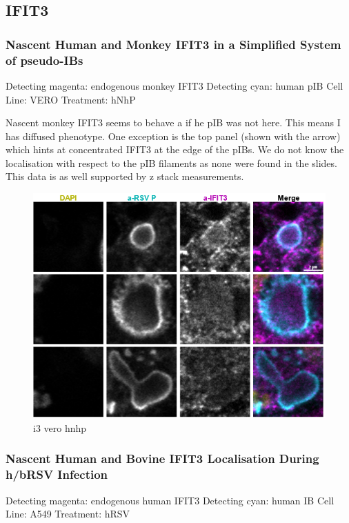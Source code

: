 \subsection{IFIT3} \label{IFIT3}
\subsubsection{Nascent Human and Monkey IFIT3 in a Simplified System of pseudo-IBs} \label{Nascent Human and Monkey IFIT3 in a Simplified System of pseudo-IBs}
Detecting magenta: endogenous monkey IFIT3 \newline
Detecting cyan: human pIB \newline
Cell Line: VERO \newline
Treatment: hNhP \newline

Nascent monkey IFIT3 seems to behave a if he pIB was not here. This means I has diffused phenotype. One exception is the top panel (shown with the arrow) which hints at concentrated IFIT3 at the edge of the pIBs. We do not know the localisation with respect to the pIB filaments as none were found in the slides. This data is as well supported by z stack measurements.

\begin{figure}
    \centering
    \includegraphics[width=1\linewidth]{08. Chapter 3/Figs/04. IFIT3/01. vero hnhp.png}
    \caption[i3 vero hnhp]{i3 vero hnhp}
    \label{i3 vero hnhp}
\end{figure}

\subsubsection{Nascent Human and Bovine IFIT3 Localisation During h/bRSV Infection} \label{Nascent Human and Bovine IFIT3 Localisation During h/bRSV Infection}
 \label{hIFIT3 Localisation During hRSV Infection}
Detecting magenta: endogenous human IFIT3 \newline
Detecting cyan: human IB \newline
Cell Line: A549 \newline
Treatment: hRSV \newline

